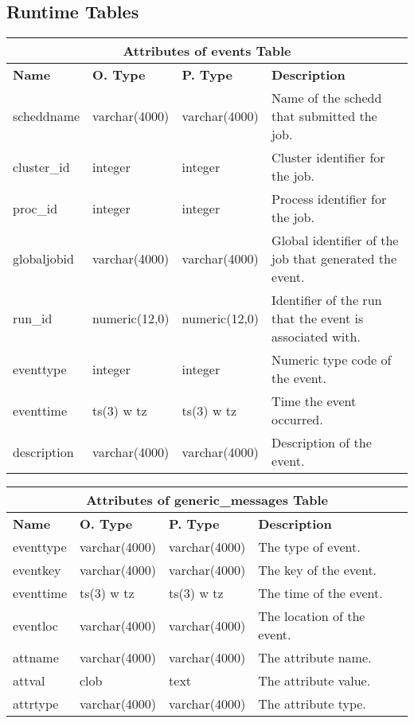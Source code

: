 \subsection{Runtime Tables}
\begin{center}
  \begin{tabular}{|l|l|l|p{3.2in}|}\hline
    \multicolumn{4}{|c|}{\textbf{Attributes of events Table}}\\ \hline
    \textbf{Name} & \textbf{O. Type} & \textbf{P. Type} & \textbf{Description}\\ \hline
    scheddname & varchar(4000) & varchar(4000) & Name of the schedd that submitted the job.\\ \hline
    cluster\_id & integer & integer & Cluster identifier for the job.\\ \hline
    proc\_id & integer & integer & Process identifier for the job.\\ \hline
    globaljobid & varchar(4000) & varchar(4000) & Global identifier of the job that generated the event.\\ \hline
    run\_id & numeric(12,0) & numeric(12,0) & Identifier of the run that the event is associated with.\\ \hline
    eventtype & integer & integer & Numeric type code of the event.\\ \hline
    eventtime & ts(3) w tz & ts(3) w tz & Time the event occurred.\\ \hline
    description & varchar(4000) & varchar(4000) & Description of the event.\\ \hline
  \end{tabular}
\vspace{24pt}

  \begin{tabular}{|l|l|l|p{3.3in}|}\hline
    \multicolumn{4}{|c|}{\textbf{Attributes of generic\_messages Table}}\\ \hline
    \textbf{Name} & \textbf{O. Type} & \textbf{P. Type} & \textbf{Description}\\ \hline
    eventtype & varchar(4000) & varchar(4000) & The type of event.\\ \hline
    eventkey & varchar(4000) & varchar(4000) & The key of the event.\\ \hline
    eventtime & ts(3) w tz & ts(3) w tz & The time of the event.\\ \hline
    eventloc & varchar(4000) & varchar(4000) & The location of the event.\\ \hline
    attname & varchar(4000) & varchar(4000) & The attribute name.\\ \hline
    attval & clob & text & The attribute value.\\ \hline
    attrtype & varchar(4000) & varchar(4000) & The attribute type.\\ \hline
  \end{tabular}
\vspace{24pt}


\end{center}
